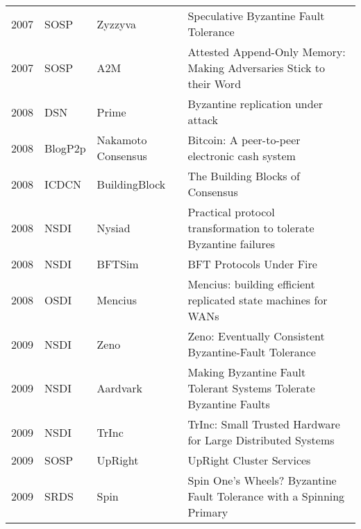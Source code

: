 \documentclass{article}
\begin{document}
\begin{landscape}
\begin{longtable}[c]{llll}
2007 & SOSP              & Zyzzyva        & Speculative Byzantine Fault Tolerance      \cite{Kotla:2007:ZSB:1323293.1294267}                                                \\
2007 & SOSP              & A2M            & Attested Append-Only Memory: Making Adversaries Stick to their Word     \cite{Chun:2007:AAM:1323293.1294280}                   \\
2008 & DSN               & Prime          & Byzantine replication under attack             \cite{Prime}                                             \\
2008 & BlogP2p          & Nakamoto Consensus       & Bitcoin: A peer-to-peer electronic cash system        \cite{Nakamoto_bitcoin:a}           \\
2008 & ICDCN             & BuildingBlock  & The Building Blocks of Consensus    \cite{Song:2008:BBC:1785854.1785862}                                                       \\
2008 & NSDI              & Nysiad         & Practical protocol transformation to tolerate Byzantine failures  \cite{Ho:2008:NPP:1387589.1387602}                        \\
2008 & NSDI              & BFTSim         & BFT Protocols Under Fire     \cite{Singh:2008:BPU:1387589.1387603}                                                              \\
2008 & OSDI              & Mencius        & Mencius: building efficient replicated state machines for WANs \cite{10.5555/1855741.1855767}                                                              \\
2009 & NSDI              & Zeno           & Zeno: Eventually Consistent Byzantine-Fault Tolerance    \cite{Singh:2009:ZEC:1558977.1558989}                                  \\
2009 & NSDI              & Aardvark       & Making Byzantine Fault Tolerant Systems Tolerate Byzantine Faults \cite{Clement:2009:MBF:1558977.1558988}                        \\
2009 & NSDI              & TrInc          & TrInc: Small Trusted Hardware for Large Distributed Systems    \cite{Levin:2009:TST:1558977.1558978}                            \\
2009 & SOSP              & UpRight        & UpRight Cluster Services    \cite{Clement:2009:UCS:1629575.1629602}                                                               \\
2009 & SRDS              & Spin           & Spin One’s Wheels? Byzantine Fault Tolerance with a Spinning Primary      \cite{Veronese:2009:SOW:1637865.1638341}                 \\

\end{longtable}
\end{landscape}
\end{document}
